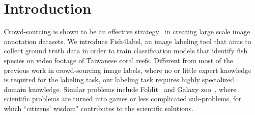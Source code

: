 \documentclass{sig-alternate}
\newcommand{\todo}[1]{\textcolor{red}{[Todo: #1]}}
\begin{document}
\section{Introduction}

%
%
%
%
%
%
%
Crowd-sourcing is shown to be an effective strategy~\cite{Russell08:Label, 
Yuen09:Label, ahnl:04, Chen:2011:LFA} in creating large scale image annotation datasets. 
We introduce Fish4label, an image labeling tool that aims to collect 
ground truth data in order to train classification models that
identify fish species on video footage of Taiwanese coral reefs. 
Different from most of the previous work in crowd-sourcing image labels, where
no or little expert knowledge is required for the labeling task, 
our labeling task requires highly specialized domain knowledge.
Similar problems include Foldit~\cite{cooper2010:pred} and Galaxy zoo~\cite{website:Galaxyzoo},
where scientific problems are turned into games or less complicated sub-problems, 
for which ``citizens' wisdom" contributes to the scientific solutions. 
\end{document}
